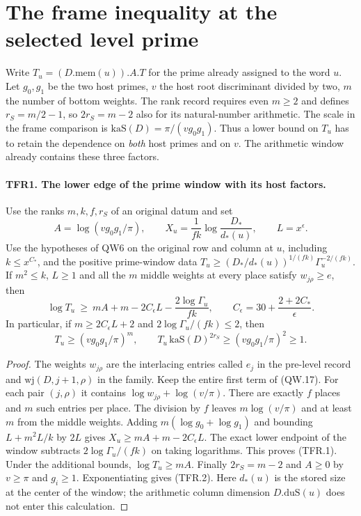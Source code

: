 \section{The frame inequality at the selected level prime}

Write $T_u=(D.\mathrm{mem}(u)).A.T$ for the prime already assigned
to the word $u$. Let $g_0,g_1$ be the two host primes, $v$ the
host root discriminant divided by two, $m$ the number of bottom
weights. The rank record requires even $m\ge2$ and defines
$r_S=m/2-1$, so $2r_S=m-2$ also for its natural-number arithmetic.
The scale in the frame comparison is
$\mathrm{kaS}(D)=\pi/(v g_0 g_1)$. Thus a lower bound on $T_u$
has to retain the dependence on \emph{both} host primes and on
$v$. The arithmetic window already contains these three factors.

\paragraph{TFR1. The lower edge of the prime window with its host factors.}
\label{claim:TFR1}
Use the ranks $m,k,f,r_S$ of an original datum and set
\[
 A=\log(vg_0g_1/\pi),\qquad
 X_u=\frac{1}{fk}\log\frac{D_*}{d_*(u)},\qquad L=x^\epsilon.
\]
Use the hypotheses of QW6 on the original row and column at $u$,
including $k\le x^{C_*}$, and the positive prime-window data
$T_u\ge (D_*/d_*(u))^{1/(fk)}\Gamma_u^{-2/(fk)}$.
If $m^2\le k$, $L\ge1$ and all the $m$ middle weights at every
place satisfy $w_{j\rho}\ge e$, then
\[
 \log T_u\ \ge\ mA+m-2C_\epsilon L
                    -\frac{2\log\Gamma_u}{fk},
 \qquad C_\epsilon=30+\frac{2+2C_*}{\epsilon}.       \tag{TFR.1}
\]
In particular, if $m\ge 2C_\epsilon L+2$ and
$2\log\Gamma_u/(fk)\le2$, then
\[
 T_u\ge(vg_0g_1/\pi)^m,\qquad
 T_u\,\mathrm{kaS}(D)^{2r_S}\ge(vg_0g_1/\pi)^2\ge1.
                                                        \tag{TFR.2}
\]

\begin{proof}
The weights $w_{j\rho}$ are the interlacing entries called $e_j$
in the pre-level record and $\mathrm{wj}(D,j+1,\rho)$ in the
family. Keep the entire first term of (QW.17). For each pair
$(j,\rho)$ it contains $\log w_{j\rho}+\log(v/\pi)$.
There are exactly $f$ places and $m$ such entries per place.
The division by $f$ leaves $m\log(v/\pi)$ and at least $m$
from the middle weights. Adding $m(\log g_0+\log g_1)$ and
bounding $L+m^2L/k$ by $2L$ gives
$X_u\ge mA+m-2C_\epsilon L$. The exact lower endpoint of the
window subtracts $2\log\Gamma_u/(fk)$ on taking logarithms.
This proves (TFR.1). Under the additional bounds,
$\log T_u\ge mA$. Finally $2r_S=m-2$ and $A\ge0$ by $v\ge\pi$
and $g_i\ge1$. Exponentiating gives (TFR.2). Here $d_*(u)$ is
the stored size at the center of the window; the arithmetic column
dimension $D.\mathrm{duS}(u)$ does not enter this calculation.
\end{proof}

